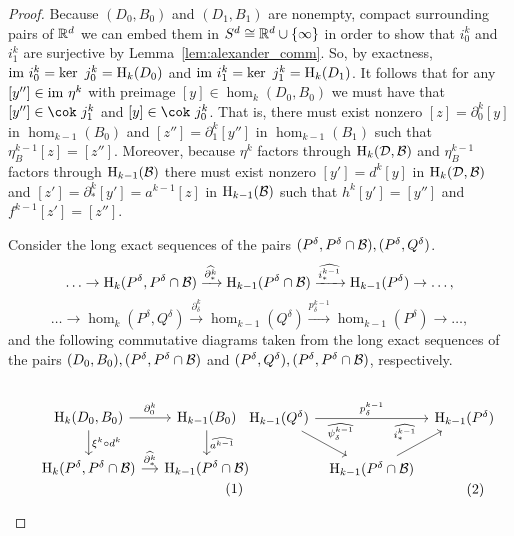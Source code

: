 \begin{proof}
  Because $(D_0, B_0)$ and $(D_1, B_1)$ are nonempty, compact surrounding pairs of $\mathbb{R}^d$ we can embed them in $S^d \cong \mathbb{R}^d\cup\{\infty\}$ in order to show that $i_0^k$ and $i_1^k$ are surjective by Lemma~\ref{lem:alexander_comm}.
  So, by exactness, $\mathrm{im}~i_0^k = \ker~j_0^k = \mathrm{H}_k(D_0)$ and $\mathrm{im}~i_1^k = \ker~j_1^k = \mathrm{H}_k(D_1)$.
  It follows that for any $[y''] \in \mathrm{im}~\eta^k$ with preimage $[y]\in \hom_k(D_0, B_0)$ we must have that $[y'']\in\cok~j^k_1$ and $[y]\in\cok~j^k_0$.
  That is, there must exist nonzero $[z] = \partial_0^k[y]$ in $\hom_{k-1}(B_0)$ and $[z''] = \partial_1^k[y'']$ in $\hom_{k-1}(B_1)$ such that $\eta_B^{k-1}[z] = [z'']$.
  Moreover, because $\eta^k$ factors through $\mathrm{H}_k({\mathcal{D}}, {\mathcal{B}})$ and $\eta^{k-1}_B$ factors through $\mathrm{H}_{k-1}({\mathcal{B}})$ there must exist nonzero $[y'] = d^k[y]$ in $\mathrm{H}_k({\mathcal{D}}, {\mathcal{B}})$ and $[z'] = \partial^k_*[y'] = a^{k-1}[z]$ in $\mathrm{H}_{k-1}({\mathcal{B}})$ such that $h^k[y'] = [y'']$ and $f^{k-1}[z'] = [z'']$.

  Consider the long exact sequences of the pairs $(P^\delta, P^\delta\cap{\mathcal{B}}), (P^\delta, Q^\delta)$.
  \[\ldots\to\mathrm{H}_k(P^\delta, P^\delta\cap {\mathcal{B}})\xrightarrow{\widehat{\partial^k_*}}
    \mathrm{H}_{k-1}(P^\delta\cap {\mathcal{B}})\xrightarrow{\widehat{i^{k-1}_*}}
    \mathrm{H}_{k-1}(P^\delta)\to\ldots, \]
  \[\ldots\to\hom_k(P^\delta, Q^\delta)\xrightarrow{\partial^k_\delta}
    \hom_{k-1}(Q^\delta)\xrightarrow{p^{k-1}_\delta}
    \hom_{k-1}(P^\delta)\to\ldots,\]
  and the following commutative diagrams taken from the long exact sequences of the pairs $(D_0, B_0), (P^\delta, P^\delta\cap{\mathcal{B}})$ and $(P^\delta, Q^\delta), (P^\delta, P^\delta\cap{\mathcal{B}})$, respectively.

  \begin{small}\begin{subequations}\label{eq:main1}
  \begin{minipage}{0.43\textwidth}\begin{equation}\label{eq:main1a}\begin{tikzcd}[column sep=small]
    \hom_k(D_0, B_0)\arrow{r}{\partial^k_0} \arrow{d}{\xi^k\circ d^k} &
    \hom_{k-1}(B_0)\arrow{d}{\widehat{a^{k-1}}}\\
    \hom_k(P^\delta, P^\delta\cap \B)\arrow{r}{\widehat{\partial_*^k}} &
    \hom_{k-1}(P^\delta\cap \B)
  \end{tikzcd}\end{equation}\end{minipage}
  \begin{minipage}{0.5\textwidth}\begin{equation}\label{eq:main1b}\begin{tikzcd}[column sep=tiny]
      \hom_{k-1}(Q^\delta)\arrow{dr}{\widehat{\psi_\delta^{k-1}}}\arrow{rr}{p_\delta^{k-1}} & &
      \hom_{k-1}(P^\delta)\\
    & \hom_{k-1}(P^\delta\cap \B)\arrow{ur}{\widehat{i_*^{k-1}}}
  \end{tikzcd}\end{equation}\end{minipage}
  \end{subequations}\end{small}\vspace{2ex}


\end{proof}
